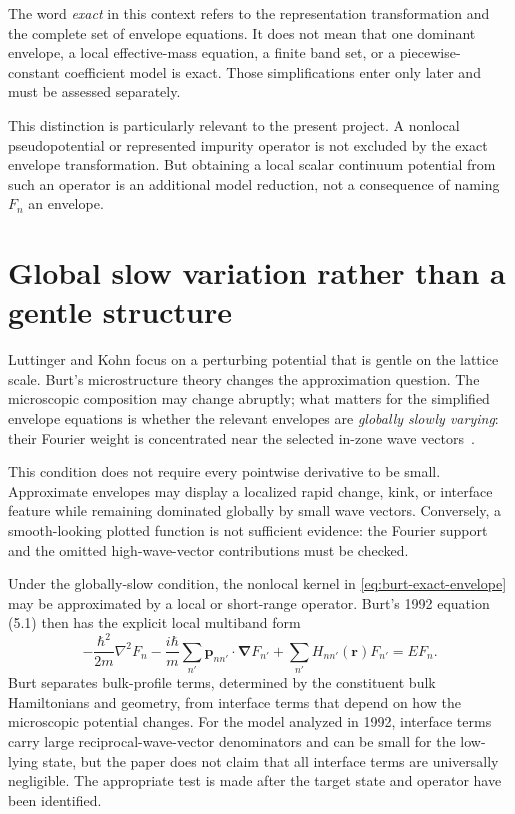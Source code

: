 The word \emph{exact} in this context refers to the representation transformation
and the complete set of envelope equations. It does not mean that one dominant
envelope, a local effective-mass equation, a finite band set, or a
piecewise-constant coefficient model is exact. Those simplifications enter only
later and must be assessed separately.

This distinction is particularly relevant to the present project. A nonlocal
pseudopotential or represented impurity operator is not excluded by the exact
envelope transformation. But obtaining a local scalar continuum potential from
such an operator is an additional model reduction, not a consequence of naming
$F_n$ an envelope.

\section{Global slow variation rather than a gentle structure}

Luttinger and Kohn focus on a perturbing potential that is gentle on the lattice
scale. Burt's microstructure theory changes the approximation question. The
microscopic composition may change abruptly; what matters for the simplified
envelope equations is whether the relevant envelopes are \emph{globally slowly
varying}: their Fourier weight is concentrated near the selected in-zone wave
vectors~\cite{burt1992,burt1999}.

This condition does not require every pointwise derivative to be small.
Approximate envelopes may display a localized rapid change, kink, or interface
feature while remaining dominated globally by small wave vectors. Conversely,
a smooth-looking plotted function is not sufficient evidence: the Fourier
support and the omitted high-wave-vector contributions must be checked.

Under the globally-slow condition, the nonlocal kernel in
\eqref{eq:burt-exact-envelope} may be approximated by a local or short-range
operator. Burt's 1992 equation (5.1) then has the explicit local multiband form
\begin{equation}
  -\frac{\hbar^2}{2m}\nabla^2F_n
  -\frac{i\hbar}{m}\sum_{n'}
    \mathbf p_{nn'}\mathbin{\cdot}\boldsymbol\nabla F_{n'}
  +\sum_{n'}H_{nn'}(\mathbf r)F_{n'}
  =
  E F_n.
  \label{eq:burt-local-multiband}
\end{equation} Burt separates bulk-profile terms, determined by the constituent
bulk Hamiltonians and geometry, from interface terms that depend on how the
microscopic potential changes. For the model analyzed in 1992, interface terms
carry large reciprocal-wave-vector denominators and can be small for the
low-lying state, but the paper does not claim that all interface terms are
universally negligible. The appropriate test is made after the target state and
operator have been identified.

